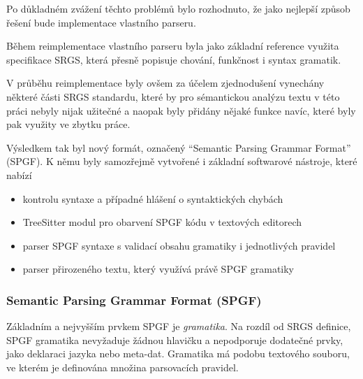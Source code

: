 Po důkladném zvážení těchto problémů bylo rozhodnuto,
že jako nejlepší způsob řešení bude implementace vlastního parseru.

Během reimplementace vlastního parseru byla jako základní reference využita specifikace SRGS,
která přesně popisuje chování, funkčnost i syntax gramatik.

V průběhu reimplementace byly ovšem za účelem zjednodušení vynechány některé části SRGS standardu,
které by pro sémantickou analýzu textu v této práci nebyly nijak užitečné a naopak byly přidány nějaké funkce navíc,
které byly pak využity ve zbytku práce.

Výsledkem tak byl nový formát, označený \enquote{Semantic Parsing Grammar Format} (SPGF).
K němu byly samozřejmě vytvořené i základní softwarové nástroje, které nabízí
\begin{itemize}
	\item kontrolu syntaxe a případné hlášení o syntaktických chybách
	\item TreeSitter modul pro obarvení SPGF kódu v textových editorech
	\item parser SPGF syntaxe s validací obsahu gramatiky i jednotlivých pravidel
	\item parser přirozeného textu, který využívá právě SPGF gramatiky
\end{itemize}

\subsubsection{Semantic Parsing Grammar Format (SPGF)}
Základním a nejvyšším prvkem SPGF je \emph{gramatika}.
Na rozdíl od SRGS definice, SPGF gramatika nevyžaduje žádnou hlavičku a nepodporuje dodatečné prvky,
jako deklaraci jazyka nebo meta-dat.
Gramatika má podobu textového souboru, ve kterém je definována množina parsovacích pravidel.

